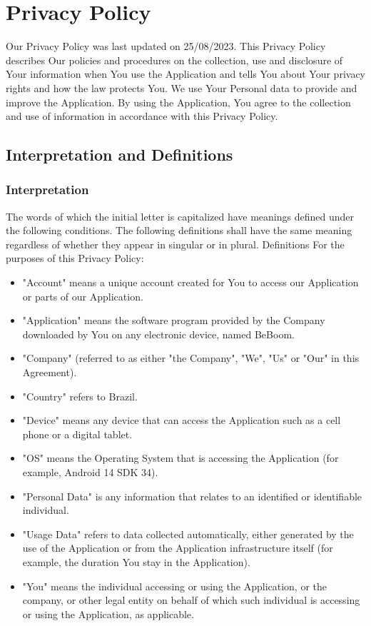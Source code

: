 \documentclass{article}
\begin{document}
\section*{Privacy Policy}
Our Privacy Policy was last updated on 25/08/2023. This Privacy Policy describes Our policies and procedures on the collection, use and disclosure of Your information when You use the Application and tells You about Your privacy rights and how the law protects You.\newline
We use Your Personal data to provide and improve the Application. By using the Application, You agree to the collection and use of information in accordance with this Privacy Policy.\newline
\subsection*{Interpretation and Definitions}
\subsubsection*{Interpretation}
The words of which the initial letter is capitalized have meanings defined under the following conditions. The following definitions shall have the same meaning regardless of whether they appear in singular or in plural.\newline
Definitions\newline
For the purposes of this Privacy Policy:
\begin{itemize}
    \item "Account" means a unique account created for You to access our Application or parts of our Application.
    \item "Application" means the software program provided by the Company downloaded by You on any electronic device, named BeBoom.
    \item "Company" (referred to as either "the Company", "We", "Us" or "Our" in this Agreement).
    \item "Country" refers to Brazil.
    \item "Device" means any device that can access the Application such as a cell phone or a digital tablet.
    \item "OS" means the Operating System that is accessing the Application (for example, Android 14 SDK 34).
    \item "Personal Data" is any information that relates to an identified or identifiable individual.
    \item "Usage Data" refers to data collected automatically, either generated by the use of the Application or from the Application infrastructure itself (for example, the duration You stay in the Application).
    \item "You" means the individual accessing or using the Application, or the company, or other legal entity on behalf of which such individual is accessing or using the Application, as applicable.
\end{itemize}
\end{document}
